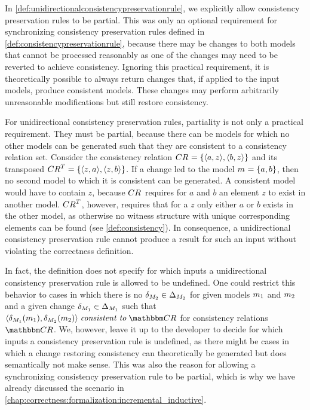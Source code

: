 In \autoref{def:unidirectionalconsistencypreservationrule}, we explicitly allow consistency preservation rules to be partial.
This was only an optional requirement for synchronizing consistency preservation rules defined in \autoref{def:consistencypreservationrule}, because there may be changes to both models that cannot be processed reasonably as one of the changes may need to be reverted to achieve consistency.
Ignoring this practical requirement, it is theoretically possible to always return changes that, if applied to the input models, produce consistent models.
These changes may perform arbitrarily unreasonable modifications but still restore consistency.

For unidirectional consistency preservation rules, partiality is not only a practical requirement.
They must be partial, because there can be models for which no other models can be generated such that they are consistent to a consistency relation set.
Consider the consistency relation $\consistencyrelation{CR}{} = \setted{\tupled{a, z}, \tupled{b, z}}$ and its transposed $\consistencyrelation{CR}{}^T = \setted{\tupled{z, a}, \tupled{z, b}}$.
If a change led to the model $\model{m}{} = \setted{a, b}$, then no second model to which it is consistent can be generated.
A consistent model would have to contain $z$, because $\consistencyrelation{CR}{}$ requires for $a$ and $b$ an element $z$ to exist in another model.
$\consistencyrelation{CR}{}^T$, however, requires that for a $z$ only either $a$ or $b$ exists in the other model, as otherwise no witness structure with unique corresponding elements can be found (see \autoref{def:consistency}).
In consequence, a unidirectional consistency preservation rule cannot produce a result for such an input without violating the correctness definition.

In fact, the definition does not specify for which inputs a unidirectional consistency preservation rule is allowed to be undefined.
One could restrict this behavior to cases in which there is no $\change{\metamodel{M}{2}} \in \changeuniverse{\metamodel{M}{2}}$ for given models $\model{m}{1}$ and $\model{m}{2}$ and a given change $\change{\metamodel{M}{1}} \in \changeuniverse{\metamodel{M}{1}}$ such that $\tupled{\change{\metamodel{M}{1}}(\model{m}{1}), \change{\metamodel{M}{2}}(\model{m}{2})} \consistenttomath \consistencyrelationset{CR}$ for consistency relations $\consistencyrelationset{CR}$.
We, however, leave it up to the developer to decide for which inputs a consistency preservation rule is undefined, as there might be cases in which a change restoring consistency can theoretically be generated but does semantically not make sense.
This was also the reason for allowing a synchronizing consistency preservation rule to be partial, which is why we have already discussed the scenario in \autoref{chap:correctness:formalization:incremental_inductive}.


